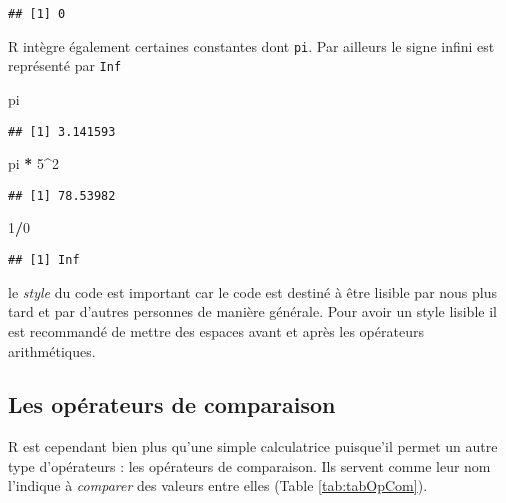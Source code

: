 \documentclass[]{book}
\newenvironment{Shaded}{\begin{snugshade}}{\end{snugshade}}
\newcommand{\DecValTok}[1]{\textcolor[rgb]{0.00,0.00,0.81}{#1}}
\newcommand{\StringTok}[1]{\textcolor[rgb]{0.31,0.60,0.02}{#1}}
\newcommand{\OperatorTok}[1]{\textcolor[rgb]{0.81,0.36,0.00}{\textbf{#1}}}
\newcommand{\NormalTok}[1]{#1}
\theoremstyle{definition}
\theoremstyle{definition}
\theoremstyle{definition}
\theoremstyle{remark}
\begin{document}
\begin{verbatim}
## [1] 0
\end{verbatim}

R intègre également certaines constantes dont \texttt{pi}. Par ailleurs
le signe infini est représenté par \texttt{Inf}

\begin{Shaded}
\begin{Highlighting}[]
\NormalTok{pi}
\end{Highlighting}
\end{Shaded}

\begin{verbatim}
## [1] 3.141593
\end{verbatim}

\begin{Shaded}
\begin{Highlighting}[]
\NormalTok{pi }\OperatorTok{*}\StringTok{ }\DecValTok{5}\OperatorTok{^}\DecValTok{2}
\end{Highlighting}
\end{Shaded}

\begin{verbatim}
## [1] 78.53982
\end{verbatim}

\begin{Shaded}
\begin{Highlighting}[]
\DecValTok{1}\OperatorTok{/}\DecValTok{0}
\end{Highlighting}
\end{Shaded}

\begin{verbatim}
## [1] Inf
\end{verbatim}

le \emph{style} du code est important car le code est destiné à être
lisible par nous plus tard et par d'autres personnes de manière
générale. Pour avoir un style lisible il est recommandé de mettre des
espaces avant et après les opérateurs arithmétiques.

\hypertarget{l011opcomp}{\subsection{Les opérateurs de
comparaison}\label{l011opcomp}}

R est cependant bien plus qu'une simple calculatrice puisque'il permet
un autre type d'opérateurs : les opérateurs de comparaison. Ils servent
comme leur nom l'indique à \emph{comparer} des valeurs entre elles
(Table \ref{tab:tabOpCom}).
\end{document}
